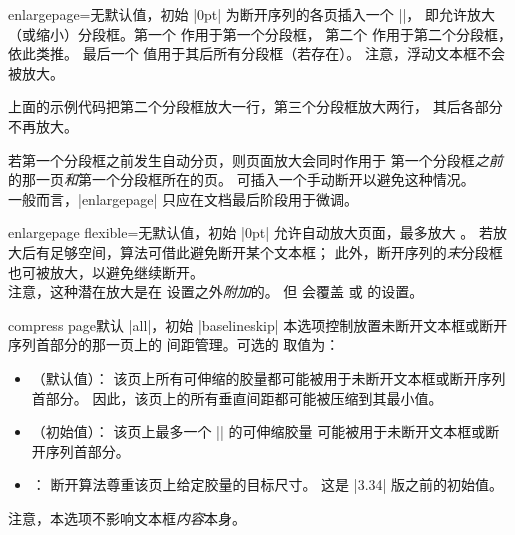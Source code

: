 \enlargethispage*{1cm}

\begin{docTcbKey}{enlargepage}{=}{无默认值，初始 |0pt|}
  为断开序列的各页插入一个 |\enlargethispage|，
  即允许放大（或缩小）分段框。第一个  作用于第一个分段框，
  第二个  作用于第二个分段框，依此类推。
  最后一个  值用于其后所有分段框（若存在）。
  注意，浮动文本框不会被放大。
\begin{dispListing}
\begin{tcolorbox}[breakable,enlargepage=0mm/\baselineskip/2\baselineskip/0mm,...
\end{dispListing}
  上面的示例代码把第二个分段框放大一行，第三个分段框放大两行，
  其后各部分不再放大。
  \begin{marker}
  若第一个分段框之前发生自动分页，则页面放大会同时作用于
  第一个分段框\emph{之前}的那一页\emph{和}第一个分段框所在的页。
  可插入一个手动断开以避免这种情况。\\
  一般而言，|enlargepage| 只应在文档最后阶段用于微调。
  \end{marker}
\end{docTcbKey}

\clearpage
\begin{docTcbKey}{enlargepage flexible}{=}{无默认值，初始 |0pt|}
  允许自动放大页面，最多放大 。
  若放大后有足够空间，算法可借此避免断开某个文本框；
  此外，断开序列的\emph{末}分段框也可被放大，以避免继续断开。\\
  注意，这种潜在放大是在  设置之外\emph{附加}的。
  但  会覆盖
   或  的设置。
\begin{dispListing}
\end{dispListing}
\end{docTcbKey}


\begin{docTcbKey}[][doc new=2014-12-15]{compress page}{}{默认 |all|，初始 |baselineskip|}
  本选项控制放置未断开文本框或断开序列首部分的那一页上的
  间距管理。可选的  取值为：
  \begin{itemize}
  \item{}（默认值）：
    该页上所有可伸缩的胶量都可能被用于未断开文本框或断开序列首部分。
    因此，该页上的所有垂直间距都可能被压缩到其最小值。
  \item{}（初始值）：
    该页上最多一个 |\baselineskip| 的可伸缩胶量
    可能被用于未断开文本框或断开序列首部分。
  \item{}：
    断开算法尊重该页上给定胶量的目标尺寸。
    这是 |3.34| 版之前的初始值。
  \end{itemize}
  \begin{marker}
  注意，本选项不影响文本框\emph{内容}本身。
  \end{marker}
\end{docTcbKey}


